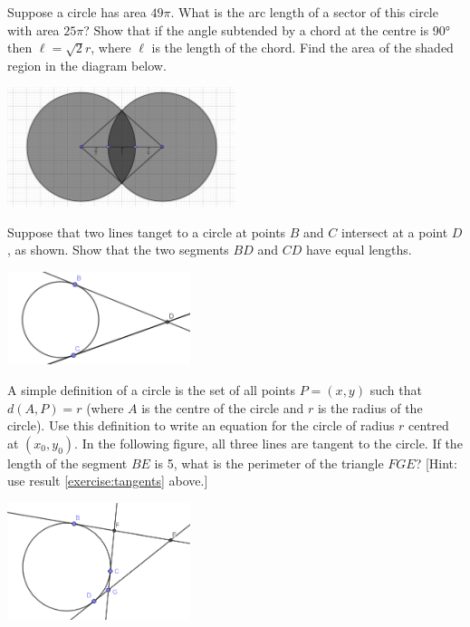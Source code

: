 \begin{questions}
  \question Suppose a circle has area $ 49\pi $. What is the arc length of a sector of this circle with area $ 25\pi $?
  \question Show that if the angle subtended by a chord at the centre is \ang{90} then $ \ell = \sqrt{2}r $, where $ \ell $
            is the length of the chord.
  \question Find the area of the shaded region in the diagram below.
            \begin{center}
              \includegraphics[width=0.5\textwidth]{overlapcircle}
            \end{center}
  \question Suppose that two lines tanget to a circle at points $ B $ and $ C $ intersect at a point $ D $, as shown. Show that
            the two segments $ BD $ and $ CD $ have equal lengths. \label{exercise:tangents}
            \begin{center}
              \includegraphics[width=0.4\textwidth]{cirtangents}
            \end{center}
  \question A simple definition of a circle is the set of all points $ P = (x,y) $ such that $ d(A, P) = r $ (where $ A $ is the centre of the circle
            and $ r $ is the radius of the circle). Use this definition to write an equation for the circle of radius $ r $ centred at $ (x_0,y_0) $.
  \clearpage
  \question In the following figure, all three lines are tangent to the circle. If the length of the segment $BE$ is 5, what is the perimeter of the triangle $FGE$?
            [Hint: use result \ref{exercise:tangents} above.]
            \begin{center}
              \includegraphics[width=0.4\textwidth]{cirtangents3}
            \end{center}
  \question
    \begin{parts}

\end{parts}
\end{questions}
